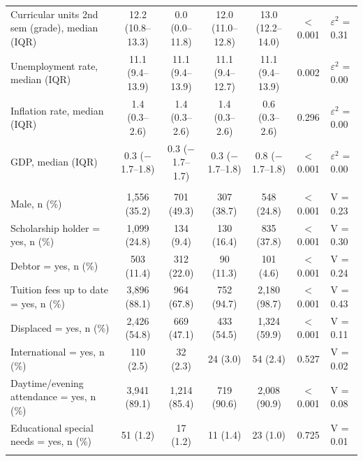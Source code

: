 \begin{table}
\begin{tabular*}{\textwidth}{@{\extracolsep\fill}@{}lcccccl@{}}
Curricular units 2nd sem (grade), median (IQR) & 12.2 (10.8--13.3) & 0.0 (0.0--11.8) & 12.0 (11.0--12.8) & 13.0 (12.2--14.0) & $<$0.001 & $\varepsilon$$^{2}$ = 0.31 \\
Unemployment rate, median (IQR) & 11.1 (9.4--13.9) & 11.1 (9.4--13.9) & 11.1 (9.4--12.7) & 11.1 (9.4--13.9) & 0.002 & $\varepsilon$$^{2}$ = 0.00 \\
Inflation rate, median (IQR) & 1.4 (0.3--2.6) & 1.4 (0.3--2.6) & 1.4 (0.3--2.6) & 0.6 (0.3--2.6) & 0.296 & $\varepsilon$$^{2}$ = 0.00 \\
GDP, median (IQR) & 0.3 ($-$1.7--1.8) & 0.3 ($-$1.7--1.7) & 0.3 ($-$1.7--1.8) & 0.8 ($-$1.7--1.8) & $<$0.001 & $\varepsilon$$^{2}$ = 0.00 \\
\addlinespace[2pt]
\multicolumn{7}{@{}l}{\textit{Binary characteristics}} \\
Male, n (\%) & 1,556 (35.2) & 701 (49.3) & 307 (38.7) & 548 (24.8) & $<$0.001 & V = 0.23 \\
Scholarship holder = yes, n (\%) & 1,099 (24.8) & 134 (9.4) & 130 (16.4) & 835 (37.8) & $<$0.001 & V = 0.30 \\
Debtor = yes, n (\%) & 503 (11.4) & 312 (22.0) & 90 (11.3) & 101 (4.6) & $<$0.001 & V = 0.24 \\
Tuition fees up to date = yes, n (\%) & 3,896 (88.1) & 964 (67.8) & 752 (94.7) & 2,180 (98.7) & $<$0.001 & V = 0.43 \\
Displaced = yes, n (\%) & 2,426 (54.8) & 669 (47.1) & 433 (54.5) & 1,324 (59.9) & $<$0.001 & V = 0.11 \\
International = yes, n (\%) & 110 (2.5) & 32 (2.3) & 24 (3.0) & 54 (2.4) & 0.527 & V = 0.02 \\
Daytime/evening attendance = yes, n (\%) & 3,941 (89.1) & 1,214 (85.4) & 719 (90.6) & 2,008 (90.9) & $<$0.001 & V = 0.08 \\
Educational special needs = yes, n (\%) & 51 (1.2) & 17 (1.2) & 11 (1.4) & 23 (1.0) & 0.725 & V = 0.01 \\
\botrule
\end{tabular*}
\end{table}

